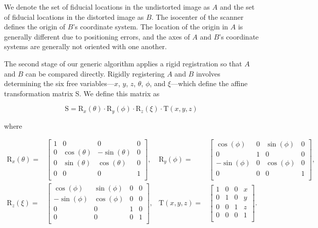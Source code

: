 \documentclass[12pt]{article}
\begin{document}
We denote the set of fiducial locations in the undistorted image as $A$ and the set of fiducial locations in the distorted image as $B$.  The isocenter of the scanner defines the origin of $B$'s coordinate system.  The location of the origin in $A$ is generally different due to positioning errors, and the axes of $A$ and $B$'s coordinate systems are generally not oriented with one another.


The second stage of our generic algorithm applies a rigid registration so that $A$ and $B$ can be compared directly.  Rigidly registering $A$ and $B$ involves determining the six free variables---$x$, $y$, $z$, $\theta$, $\phi$, and $\xi$---which define the affine transformation matrix S.  We define this matrix as

\begin{equation*}
    \mathrm{S} = \mathrm{R}_x(\theta) \cdot \mathrm{R}_y(\phi) \cdot \mathrm{R}_z(\xi) \cdot \mathrm{T}(x, y, z)
\end{equation*}

where

\begin{align*}
    \mathrm{R}_x(\theta) =&
    \begin{bmatrix}
        1 & 0 & 0 & 0\\
        0 & \cos(\theta) & -\sin(\theta) & 0\\
        0 & \sin(\theta) & \cos(\theta) & 0\\
        0 & 0 & 0 & 1\\
    \end{bmatrix},&
    \mathrm{R}_y(\phi) =&
    \begin{bmatrix}
        \cos(\phi) & 0 & \sin(\phi) & 0\\
        0 & 1 & 0 & 0\\
        -\sin(\phi) & 0 & \cos(\phi) & 0\\
        0 & 0 & 0 & 1\\
    \end{bmatrix},
    \\
    \mathrm{R}_z(\xi) =&
    \begin{bmatrix}
        \cos(\phi) & \sin(\phi) & 0 & 0\\
        -\sin(\phi) & \cos(\phi) & 0 & 0\\
        0 & 0 & 1 & 0\\
        0 & 0 & 0 & 1\\
    \end{bmatrix},&
    \mathrm{T}(x, y, z) =&
    \begin{bmatrix}
        1 & 0 & 0 & x\\
        0 & 1 & 0 & y\\
        0 & 0 & 1 & z\\
        0 & 0 & 0 & 1\\
    \end{bmatrix}.
\end{align*}
\end{document}

